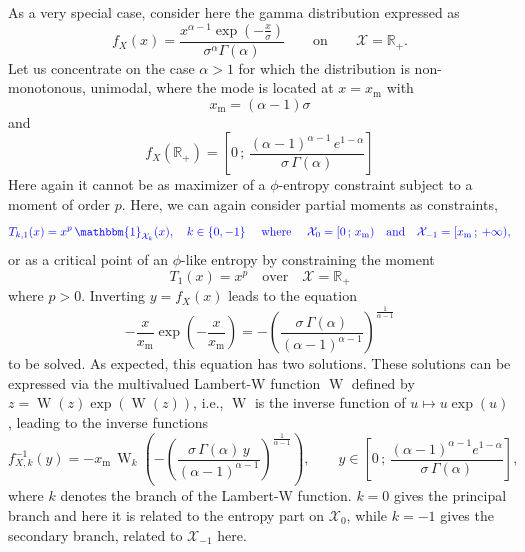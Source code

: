 \documentclass[entropy,article,submit,moreauthors,pdftex]{Definitions/mdpi}
\newcommand{\SZ}[1]{{\color{blue} #1}}                                       %
\def\Rset{\mathbb{R}}%
\def\X{\mathcal{X}}%
\def\un{\mathbbm{1}}%
\def\W{\operatorname{W}} %
\begin{document}
As a very special case, consider here the gamma distribution expressed as
%
\SZ{
\[
f_X(x) = \frac{x^{\alpha-1}  \exp\left(- \frac{x}{\sigma} \right)}{\sigma^\alpha
  \Gamma(\alpha)} \qquad \mbox{on} \qquad \X = \Rset_+.
\]
}
%
Let  us concentrate  on the  case $\alpha  > 1$  for which  the distribution  is
non-monotonous, unimodal, where the mode is located at \SZ{$x = x_{\mathrm{m}}$ with
  \[
  x_{\mathrm{m}} = (\alpha-1) \sigma
  \]
  and
  \[
  f_X(\Rset_+) = \left[ 0 \, ; \, \frac{(\alpha-1)^{\alpha-1} \, e^{1-\alpha}}{\sigma \, \Gamma(\alpha)} \right]
  \]
}
%
Here again it cannot be \SZ{as  maximizer of a $\phi$-entropy constraint subject
  to a moment of order $p$}.  Here, we can again \SZ{consider partial moments as
  constraints,}
%
\[
\SZ{T_{k,1}(x)  =  x^p \,  \un_{\X_k}(x),  \quad  k \in  \{  0  , -1  \}  \quad
  \mbox{ where } \quad  \X_0 =  [ 0  \, ; \,  x_{\mathrm{m}} )  \quad \mbox{and}
    \quad \X_{-1} = [ x_{\mathrm{m}} \, ; \: +\infty ),}
\]
%
or as \SZ{a critical point of an $\phi$-like entropy by constraining} the moment 
%
\[
T_1(x) = x^p \quad \mbox{over} \quad \X = \Rset_+
\]
%
where $p > 0$. Inverting $y = f_X(x)$ leads to the equation
%
\SZ{
\[
- \frac{x}{x_{\mathrm{m}}}  \exp\left( -  \frac{x}{x_{\mathrm{m}}}  \right) =  -
\left(       \frac{\sigma        \,       \Gamma(\alpha)}{(\alpha-1)^{\alpha-1}}
\right)^{\frac{1}{\alpha-1}}
\]
}
%
to be solved. As expected, this  equation has two solutions. These solutions can
be  expressed   via  the   multivalued  Lambert-W   function  $\W$   defined  by
$z=\W(z)\exp(\W(z))$,  i.e., $\W$  is  the  inverse function  of  $u \mapsto  u
\exp(u)$\cite[\S~1]{CorGon96}, leading to the inverse functions
%
\SZ{
\[
f_{X,k}^{-1}(y) = -  x_{\mathrm{m}} \, \W_k\left(       -  \left( \frac{\sigma        \,       \Gamma(\alpha) \, y}{(\alpha-1)^{\alpha-1}}
\right)^{\frac{1}{\alpha-1}} \right)
,  \qquad y \in  \left[ 0 \, ;  \, \frac{(\alpha-1)^{\alpha-1} e^{1-\alpha}}{\sigma \, \Gamma(\alpha)}
  \right],
\]
}
%
where  $k$  denotes the  branch  of  the  Lambert-W  function. $k=0$  gives  the
principal branch and here it is related  to the entropy part on $\X_0$, while $k
= -1$ gives the secondary branch, related to $\X_{-1}$ here.
\end{document}
